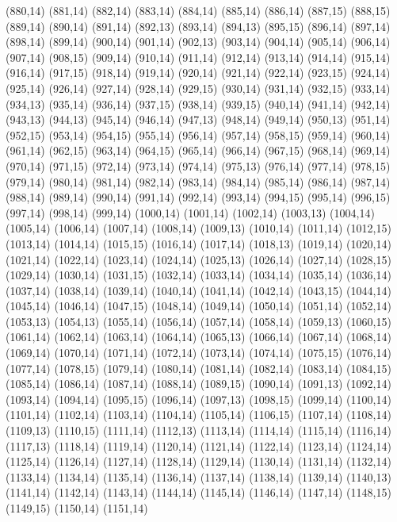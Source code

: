 (880,14)
(881,14)
(882,14)
(883,14)
(884,14)
(885,14)
(886,14)
(887,15)
(888,15)
(889,14)
(890,14)
(891,14)
(892,13)
(893,14)
(894,13)
(895,15)
(896,14)
(897,14)
(898,14)
(899,14)
(900,14)
(901,14)
(902,13)
(903,14)
(904,14)
(905,14)
(906,14)
(907,14)
(908,15)
(909,14)
(910,14)
(911,14)
(912,14)
(913,14)
(914,14)
(915,14)
(916,14)
(917,15)
(918,14)
(919,14)
(920,14)
(921,14)
(922,14)
(923,15)
(924,14)
(925,14)
(926,14)
(927,14)
(928,14)
(929,15)
(930,14)
(931,14)
(932,15)
(933,14)
(934,13)
(935,14)
(936,14)
(937,15)
(938,14)
(939,15)
(940,14)
(941,14)
(942,14)
(943,13)
(944,13)
(945,14)
(946,14)
(947,13)
(948,14)
(949,14)
(950,13)
(951,14)
(952,15)
(953,14)
(954,15)
(955,14)
(956,14)
(957,14)
(958,15)
(959,14)
(960,14)
(961,14)
(962,15)
(963,14)
(964,15)
(965,14)
(966,14)
(967,15)
(968,14)
(969,14)
(970,14)
(971,15)
(972,14)
(973,14)
(974,14)
(975,13)
(976,14)
(977,14)
(978,15)
(979,14)
(980,14)
(981,14)
(982,14)
(983,14)
(984,14)
(985,14)
(986,14)
(987,14)
(988,14)
(989,14)
(990,14)
(991,14)
(992,14)
(993,14)
(994,15)
(995,14)
(996,15)
(997,14)
(998,14)
(999,14)
(1000,14)
(1001,14)
(1002,14)
(1003,13)
(1004,14)
(1005,14)
(1006,14)
(1007,14)
(1008,14)
(1009,13)
(1010,14)
(1011,14)
(1012,15)
(1013,14)
(1014,14)
(1015,15)
(1016,14)
(1017,14)
(1018,13)
(1019,14)
(1020,14)
(1021,14)
(1022,14)
(1023,14)
(1024,14)
(1025,13)
(1026,14)
(1027,14)
(1028,15)
(1029,14)
(1030,14)
(1031,15)
(1032,14)
(1033,14)
(1034,14)
(1035,14)
(1036,14)
(1037,14)
(1038,14)
(1039,14)
(1040,14)
(1041,14)
(1042,14)
(1043,15)
(1044,14)
(1045,14)
(1046,14)
(1047,15)
(1048,14)
(1049,14)
(1050,14)
(1051,14)
(1052,14)
(1053,13)
(1054,13)
(1055,14)
(1056,14)
(1057,14)
(1058,14)
(1059,13)
(1060,15)
(1061,14)
(1062,14)
(1063,14)
(1064,14)
(1065,13)
(1066,14)
(1067,14)
(1068,14)
(1069,14)
(1070,14)
(1071,14)
(1072,14)
(1073,14)
(1074,14)
(1075,15)
(1076,14)
(1077,14)
(1078,15)
(1079,14)
(1080,14)
(1081,14)
(1082,14)
(1083,14)
(1084,15)
(1085,14)
(1086,14)
(1087,14)
(1088,14)
(1089,15)
(1090,14)
(1091,13)
(1092,14)
(1093,14)
(1094,14)
(1095,15)
(1096,14)
(1097,13)
(1098,15)
(1099,14)
(1100,14)
(1101,14)
(1102,14)
(1103,14)
(1104,14)
(1105,14)
(1106,15)
(1107,14)
(1108,14)
(1109,13)
(1110,15)
(1111,14)
(1112,13)
(1113,14)
(1114,14)
(1115,14)
(1116,14)
(1117,13)
(1118,14)
(1119,14)
(1120,14)
(1121,14)
(1122,14)
(1123,14)
(1124,14)
(1125,14)
(1126,14)
(1127,14)
(1128,14)
(1129,14)
(1130,14)
(1131,14)
(1132,14)
(1133,14)
(1134,14)
(1135,14)
(1136,14)
(1137,14)
(1138,14)
(1139,14)
(1140,13)
(1141,14)
(1142,14)
(1143,14)
(1144,14)
(1145,14)
(1146,14)
(1147,14)
(1148,15)
(1149,15)
(1150,14)
(1151,14)
